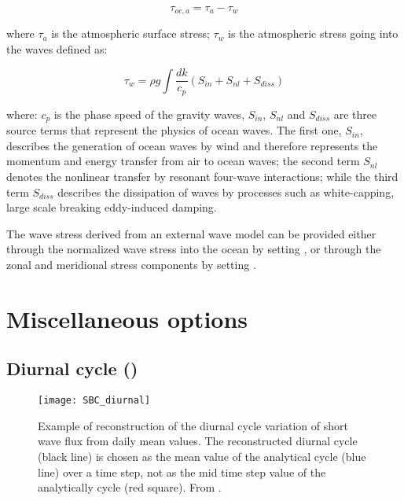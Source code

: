 \documentclass[../main/NEMO_manual]{subfiles}
\begin{document}
\[
  \tau_{oc,a} = \tau_a - \tau_w
\]

where $\tau_a$ is the atmospheric surface stress;
$\tau_w$ is the atmospheric stress going into the waves defined as:

\[
  \tau_w = \rho g \int {\frac{dk}{c_p} (S_{in}+S_{nl}+S_{diss})}
\]

where: $c_p$ is the phase speed of the gravity waves,
$S_{in}$, $S_{nl}$ and $S_{diss}$ are three source terms that represent
the physics of ocean waves. The first one, $S_{in}$, describes the generation
of ocean waves by wind and therefore represents the momentum and energy transfer
from air to ocean waves; the second term $S_{nl}$ denotes
the nonlinear transfer by resonant four-wave interactions; while the third term $S_{diss}$
describes the dissipation of waves by processes such as white-capping, large scale breaking
eddy-induced damping.

The wave stress derived from an external wave model can be provided either through the normalized
wave stress into the ocean by setting , or through the zonal and
meridional stress components by setting .

\section{Miscellaneous options}
\label{sec:SBC_misc}

\subsection[Diurnal cycle (\textit{sbcdcy.F90})]{Diurnal cycle (\protect{})}
\label{subsec:SBC_dcy}

\begin{figure}[!t]
  \centering
  \texttt{[image: SBC\_diurnal]}
  \caption[Reconstruction of the diurnal cycle variation of short wave flux]{
    Example of reconstruction of the diurnal cycle variation of short wave flux from
    daily mean values.
    The reconstructed diurnal cycle (black line) is chosen as
    the mean value of the analytical cycle (blue line) over a time step,
    not as the mid time step value of the analytically cycle (red square).
    From \citet{bernie.guilyardi.ea_CD07}.}
  \label{fig:SBC_diurnal}
\end{figure}
\end{document}
